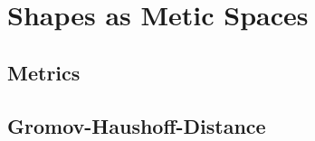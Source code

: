 \chapter{Shapes as Metic Spaces}
\label{chapter:shapeSpaces}

\section{Metrics}
\section{Gromov-Haushoff-Distance}


